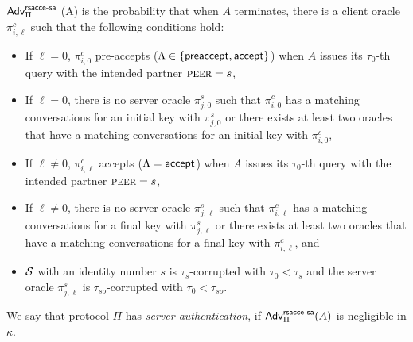 \begin{definition} \label{def:rsacce-sa}
 $\mathsf{Adv}^{\mathsf{rsacce\textsc{-} sa}}_{\Pi}$ (A) is the probability that when
 $A$ terminates, there is a client oracle $\pi^c_{i, \ell}$
 such that the following conditions hold:
 \begin{itemize}
  \item{If $\ell = 0$, $\pi^c_{i, 0}$ pre-accepts
  ($\Lambda \in \{\mathsf{preaccept}, \mathsf{accept} \}$) when $A$ issues its
  $\tau_0$-th query with the intended partner $\textsc{peer}=s$, }

  \item{If $\ell = 0$, there is no server oracle
  $\pi^s_{j, 0}$ such
  that $\pi^c_{i,0}$ has a matching conversations for an initial
  key with
  $\pi^s_{j,0}$ or there exists at least two oracles that have
  a matching conversations for an initial key with $\pi^c_{i,0}$,}

  \item{If $\ell \neq 0$, $\pi^c_{i, \ell}$
  accepts ($\Lambda = \mathsf{accept}$) when $A$ issues its
  $\tau_0$-th query with the intended partner $\textsc{peer}=s$, }

  \item{If $\ell \neq 0$, there is no server oracle
  $\pi^s_{j, \ell}$ such
  that $\pi^c_{i,\ell}$ has a matching conversations for a final
  key with
  $\pi^s_{j,\ell}$ or there exists at least two oracles that have
  a matching conversations for a final key with $\pi^c_{i,\ell}$, and}

  \item{$\mathcal{S}$ with an identity number $s$ is $\tau_{s}$-corrupted with
  $\tau_0 < \tau_{s}$ and the server oracle $\pi^s_{j, \ell}$ is
  $\tau_{so}$-corrupted with $\tau_0 < \tau_{so}$. }

 \end{itemize}
 We say that protocol $\Pi$ has \textit{server authentication},
 if $\mathsf{Adv}^{\mathsf{rsacce\textsc{-} sa}}_{\Pi}(A)$ is negligible in $\kappa$.
\end{definition}

